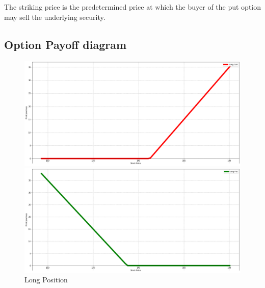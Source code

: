 \noindent The striking price is the predetermined price at which the buyer of the put option may sell the underlying security.
\subsection{Option Payoff diagram}

\begin{figure}[!htb]
	\begin{minipage}[l]{0.5\linewidth}
		\begin{center}
			\includegraphics[width=1\textwidth]{Long_call}
		\end{center}
	\end{minipage}
	\hfill
	\begin{minipage}[r]{0.5\linewidth}
		\begin{center}
			\includegraphics[width=1\textwidth]{Long_put}
		\end{center}
	\end{minipage}
	\caption{ Long Position}
\end{figure}

